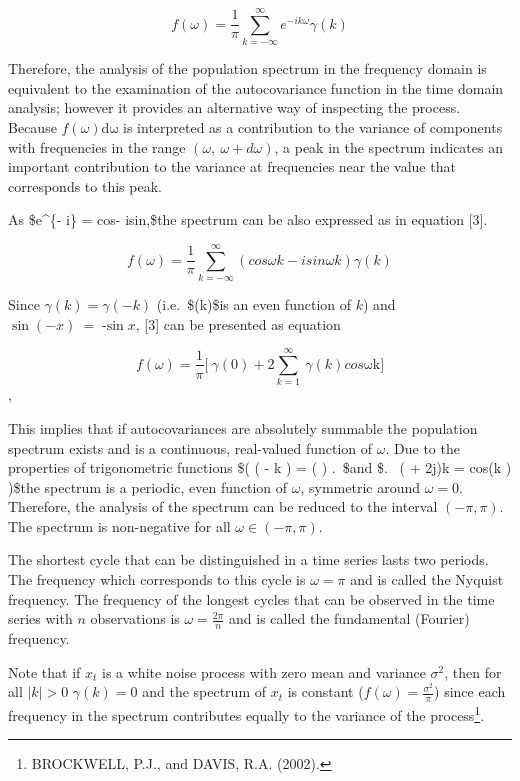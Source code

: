 \documentclass[
  letterpaper,
  DIV=11,
  numbers=noendperiod]{scrreprt}
\begin{document}
\[f( \omega ) = \frac{1}{\pi}\sum_{k = - \infty}^{\infty}{e^{- ik\omega}\gamma(k)}\]

Therefore, the analysis of the population spectrum in the frequency
domain is equivalent to the examination of the autocovariance function
in the time domain analysis; however it provides an alternative way of
inspecting the process. Because \(f( \omega )\text{dω}\) is interpreted
as a contribution to the variance of components with frequencies in the
range \((\omega,\ \omega + d\omega)\), a peak in the spectrum indicates
an important contribution to the variance at frequencies near the value
that corresponds to this peak.

As \$e\^{}\{- i\omega\} = cos\omega - isin\omega,\$the spectrum can be
also expressed as in equation {[}3{]}.

\[f( \omega ) = \frac{1}{\pi}\sum_{k = - \infty}^{\infty}{(cos\omega k - isin\omega k)\gamma(k)}\]

Since \(\gamma(k) = \gamma( - k)\) (i.e.~\$\gamma(k)\$is an even
function of \(k\)) and \(\sin{( - x)}\  = \operatorname{-sin}x\),
{[}3{]} can be presented as equation

\[f( \omega ) = \frac{1}{\pi}\lbrack \ \gamma(0) + 2\sum_{k = 1}^{\infty}{\ \gamma(k)}cos\text{ωk} \rbrack\],

This implies that if autocovariances are absolutely summable the
population spectrum exists and is a continuous, real-valued function of
\(\omega\). Due to the properties of trigonometric functions \$( \cos( -
\omega k ) = \cos(  ) .~\$and \$. ~\cos( \omega + 2\pi j)k =
cos(\omega k ) )\$the spectrum is a periodic, even function of
\(\omega\), symmetric around \(\omega = 0\). Therefore, the analysis of
the spectrum can be reduced to the interval \(( - \pi,\pi).\) The
spectrum is non-negative for all \(\omega \in ( - \pi,\pi)\).

The shortest cycle that can be distinguished in a time series lasts two
periods. The frequency which corresponds to this cycle is
\(\omega = \pi\) and is called the Nyquist frequency. The frequency of
the longest cycles that can be observed in the time series with \(n\)
observations is \(\omega = \frac{2\pi}{n}\) and is called the
fundamental (Fourier) frequency.

Note that if \(x_{t}\) is a white noise process with zero mean and
variance \(\sigma^{2}\), then for all \(|k|> 0\) \(\gamma(k)=0\) and the
spectrum of \(x_{t}\) is constant
(\(f(\omega)= \frac{\sigma^{2}}{\pi}\)) since each frequency in the
spectrum contributes equally to the variance of the process\footnote{BROCKWELL,
  P.J., and DAVIS, R.A. (2002).}.
\end{document}
